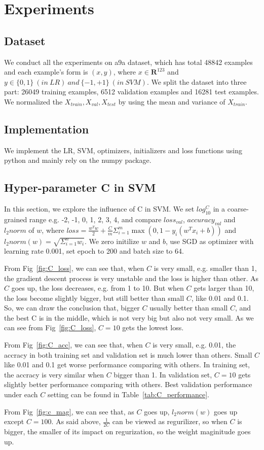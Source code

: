 \documentclass[journal, a4paper]{IEEEtran}
\begin{document}
\section{Experiments}
\subsection{Dataset}
We conduct all the experiments on a9a dataset, which has total 48842 examples and each example's form is $(x, y)$, where $x \in \mathbf{R}^{123}$ and $y \in \{0, 1\}~(in~LR)~and~\{-1, +1\}~(in~SVM)$. We split the dataset into three part: 26049 training examples, 6512 validation examples and 16281 test examples. We normalized the $X_{train}, X_{val}, X_{test} $ by using the mean and variance of $X_{train}$.

\subsection{Implementation}
We implement the LR, SVM, optimizers, initializers and loss functions using python and mainly rely on the numpy package.

\subsection{Hyper-parameter C in SVM}
In this section, we explore the influence of C in SVM. We set $log_{10}^{C}$ in a coarse-grained range e.g. -2, -1, 0, 1, 2, 3, 4, and compare $loss_{val}$,  $accuracy_{val}$ and $l_2norm$ of $w$, where $loss =  \frac{w^Tw}{2} + \frac{C}{m}\Sigma_{i=1}^m \max(0, 1 - y_i(w^Tx_i + b))$ and $ l_2norm(w) = \sqrt{\Sigma_{i=1}^n w_i}$. We zero initilize $w$ and $b$, use SGD as optimizer with learning rate 0.001, set epoch to 200 and batch size to 64. \par
From Fig~\ref{fig:C_loss}, we can see that, when $C$ is very small, e.g. smaller than 1, the gradient descent process is very unstable and the loss is higher than other. As $C$ goes up, the loss decreases, e.g. from 1 to 10. But when $C$ gets larger than 10, the loss become slightly bigger, but still better than small $C$, like 0.01 and 0.1. So, we can draw the conclusion that, bigger $C$ usually better than small $C$, and the best C is in the middle, which is not very big but also not very small. As we can see from Fig~\ref{fig:C_loss}, $C = 10$ gets the lowest loss.   \par
From Fig~\ref{fig:C_acc}, we can see that, when $C$ is very small, e.g. 0.01, the accracy in both training set and validation set is much lower than others. Small $C$ like 0.01 and 0.1 get worse performance comparing with others. In training set, the accracy is very similar when $C$ bigger than 1. In validation set, $C = 10$ gets slightly better performance comparing with others. Best validation performance under each $C$ setting can be found in Table~\ref{tab:C_performance}. \par
From Fig~\ref{fig:c_mag}, we can see that, as $C$ goes up, $l_2norm(w)$ goes up except $C = 100$. As said above, $\frac{1}{2C}$ can be viewed as regurilizer, so when $C$ is bigger, the smaller of its impact on regurization, so the weight maginitude goes up. \par
\end{document}
